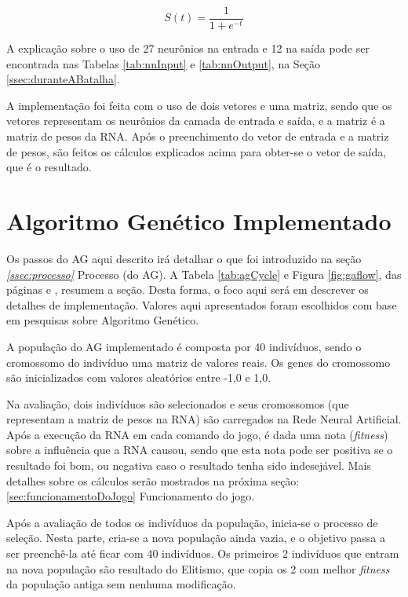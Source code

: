 \documentclass[
	12pt,					%
	openright,				%
	oneside,				%
	a4paper,				%
	bibjustif,				%
	chapter=TITLE,			%
	english,				%
	brazil,					%
	]{abntex2}
\begin{document}
	\begin{equation}
		S(t) = \frac{1}{1 + e^{-t}}
		\label{eq:sigmoid}
	\end{equation}
	
	\vspace{3mm}
	
	A explicação sobre o uso de 27 neurônios na entrada e 12 na saída
	pode ser encontrada nas Tabelas \ref{tab:nnInput} e \ref{tab:nnOutput}, na Seção \ref{ssec:duranteABatalha}.
	
	A implementação foi feita com o uso de dois vetores e uma matriz,
	sendo que os vetores representam os neurônios da camada de entrada e saída,
	e a matriz é a matriz de pesos da RNA.
	Após o preenchimento do vetor de entrada e a matriz de pesos,
	são feitos os cálculos explicados acima para obter-se o vetor de saída,
	que é o resultado.
	
	\FloatBarrier
	\section{Algoritmo Genético Implementado}
	Os passos do AG aqui descrito irá detalhar o que foi introduzido na seção \textit{\ref{ssec:processo}} Processo (do AG).
	A Tabela \ref{tab:agCycle} e Figura \ref{fig:gaflow},
	das páginas \pageref{tab:agCycle} e \pageref{fig:gaflow},
	resumem a seção.
	Desta forma, o foco aqui será em descrever os detalhes de implementação.
	Valores aqui apresentados foram escolhidos com base em pesquisas sobre Algoritmo Genético.
	
	A população do AG implementado é composta por 40 indivíduos,
	sendo o cromossomo do indivíduo uma matriz de valores reais.
	Os genes do cromossomo são inicializados com valores aleatórios entre -1,0 e 1,0.
	
	Na avaliação,
	dois indivíduos são selecionados e seus cromossomos
	(que representam a matriz de pesos na RNA)
	são carregados na Rede Neural Artificial.
	Após a execução da RNA em cada comando do jogo,
	é dada uma nota (\textit{fitness}) sobre a influência que a RNA causou,
	sendo que esta nota pode ser
	positiva se o resultado foi bom,
	ou negativa caso o resultado tenha sido indesejável.
	Mais detalhes sobre os cálculos serão mostrados na próxima seção:
	\ref{sec:funcionamentoDoJogo} Funcionamento do jogo.
	
	Após a avaliação de todos os indivíduos da população,
	inicia-se o processo de seleção.
	Nesta parte, cria-se a nova população ainda vazia,
	e o objetivo passa a ser preenchê-la até ficar com 40 indivíduos.
	Os primeiros 2 indivíduos que entram na nova população são resultado do Elitismo,
	que copia os 2 com melhor \textit{fitness} da população antiga sem nenhuma modificação.
	
\end{document}
